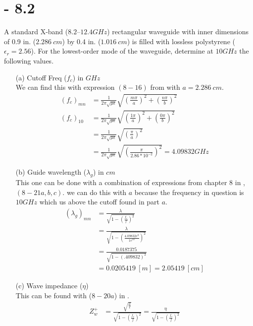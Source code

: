 \documentclass[12pt]{article}
\begin{document}
\section{- 8.2}
A standard X-band ($8.2–12.4 GHz$) rectangular waveguide with inner dimensions of 0.9 in. ($2.286\ cm$) by 0.4 in. ($1.016\ cm$) is filled with lossless polystyrene ($\epsilon_r = 2.56$). For the lowest-order mode of the waveguide, determine at $10 GHz$ the following values.
\begin{itemize}
\item[(a)] Cutoff Freq ($f_c$) in $GHz$\\
  We can find this with expression $(8-16)$ from \cite{balanis_2012} with $a = 2.286\ cm$.
  \begin{align*}
    (f_{c})_{mn} &= \frac{1}{2\pi\sqrt{\mu\epsilon}}\sqrt{\left(\frac{m\pi}{a}\right)^2 + \left(\frac{n\pi}{b}\right)^2}\\
    (f_{c})_{10}  &= \frac{1}{2\pi\sqrt{\mu\epsilon}}\sqrt{\left(\frac{1\pi}{a}\right)^2 + \left(\frac{0\pi}{b}\right)^2}\\
                 &= \frac{1}{2\pi\sqrt{\mu\epsilon}}\sqrt{\left(\frac{\pi}{a}\right)^2}\\
    &= \frac{1}{2\pi\sqrt{\mu\epsilon}}\sqrt{\left(\frac{\pi}{2.86*10^{-2}}\right)^2} = 4.09832 GHz
  \end{align*}
\item[(b)] Guide wavelength ($\lambda_g$) in $cm$\\
  This one can be done with a combination of expressions from chapter 8 in \cite{balanis_2012}, $(8-21a,b,c)$. we can do this with $a$ because the frequency in question is $10GHz$ which us above the cutoff found in part $a$.
  \begin{align*}
    (\lambda_g)_{mn} &= \frac{\lambda}{\sqrt{1-\left(\frac{f_c}{f}\right)^2}}\\
                     &= \frac{\lambda}{\sqrt{1-\left(\frac{4.09832e^{9}}{1e^{10}}\right)^2}}\\
                     &= \frac{0.0187375}{\sqrt{1-\left(.409832\right)^2}}\\
                     &= 0.0205419\ [m] = 2.05419\ [cm]
  \end{align*}
\item[(c)] Wave impedance ($\eta$)\\
  This can be found with ($8-20a$) in \cite{balanis_2012}.
  \begin{align*}
    Z_w^+ &= \frac{\sqrt{\frac{\mu}{\epsilon}}}{\sqrt{1-\left(\frac{f_c}{f}\right)^2}} = \frac{\eta}{\sqrt{1-\left(\frac{f_c}{f}\right)^2}}\\

\end{align*}
\end{itemize}
\end{document}
